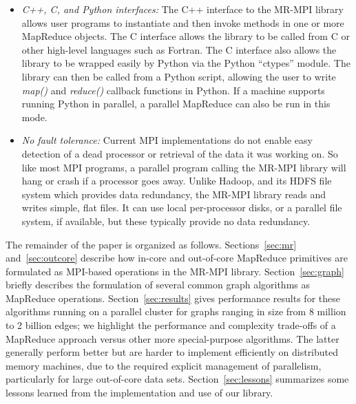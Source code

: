 \begin{itemize}
\item {\it C++, C, and Python interfaces:} The C++ interface to the
MR-MPI library allows user programs to instantiate and then invoke
methods in one or more MapReduce objects.  The C interface allows the
library to be called from C or other high-level languages such as
Fortran.  The C interface also allows the library to be wrapped easily
by Python via the Python ``ctypes'' module.  The library can then be
called from a Python script, allowing the user to write {\it map()} and
{\it reduce()} callback functions in Python.  If a machine supports running
Python in parallel, a parallel MapReduce can also be run in this mode.

\item {\it No fault tolerance:} Current MPI implementations do not enable
easy detection of a dead processor or retrieval of the data it was
working on.  So like most MPI programs, a parallel program calling the
MR-MPI library will hang or crash if a processor goes away.  Unlike
Hadoop, and its HDFS file system which provides data redundancy,
the MR-MPI library reads and writes simple, flat files.  It can
use local per-processor disks, or a parallel file system, if
available, but these typically provide no data redundancy.

\end{itemize}

The remainder of the paper is organized as follows.
Sections~\ref{sec:mr} and~\ref{sec:outcore} describe how in-core and
out-of-core MapReduce primitives are formulated as MPI-based
operations in the MR-MPI library.  Section~\ref{sec:graph} briefly
describes the formulation of several common graph algorithms as
MapReduce operations.  Section~\ref{sec:results} gives performance
results for these algorithms running on a parallel cluster for graphs
ranging in size from 8 million to 2 billion edges; we highlight the
performance and complexity trade-offs of a MapReduce approach versus
other more special-purpose algorithms.  The latter generally perform
better but are harder to implement efficiently on distributed memory
machines, due to the required explicit management of parallelism,
particularly for large out-of-core data sets.
Section~\ref{sec:lessons} summarizes some lessons learned from the
implementation and use of our library.
